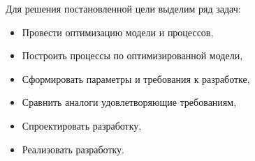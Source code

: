 Для решения постановленной цели выделим ряд задач:
\begin{itemize}
	\item Провести оптимизацию модели и процессов,
	\item Построить процессы по оптимизированной модели,
	\item Сформировать параметры и требования к разработке,
	\item Сравнить аналоги удовлетворяющие требованиям,
	\item Спроектировать разработку,
	\item Реализовать разработку.
\end{itemize}
\pagebreak